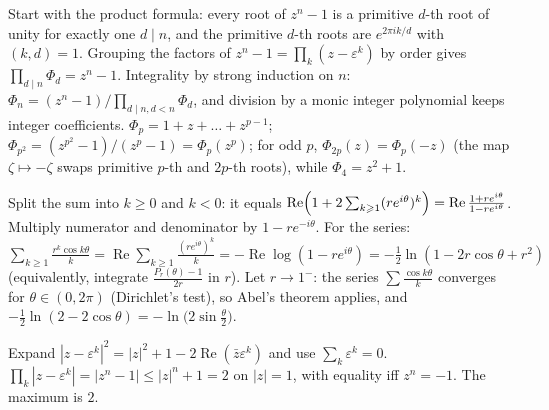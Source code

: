 \documentclass[11pt,a4paper]{article}
\begin{document}
 Start with the product formula: every root of $z^n-1$ is a primitive $d$-th root of unity for exactly one $d\mid n$, and the primitive $d$-th roots are $e^{2\pi ik/d}$ with $(k,d)=1$. Grouping the factors of $z^n-1=\prod_k(z-\varepsilon^k)$ by order gives $\prod_{d\mid n}\Phi_d=z^n-1$.
 Integrality by strong induction on $n$: $\Phi_n=(z^n-1)/\prod_{d\mid n,d<n}\Phi_d$, and division by a monic integer polynomial keeps integer coefficients.
 $\Phi_p=1+z+\dots+z^{p-1}$; $\Phi_{p^2}=(z^{p^2}-1)/(z^p-1)=\Phi_p(z^p)$; for odd $p$, $\Phi_{2p}(z)=\Phi_p(-z)$ (the map $\zeta\mapsto-\zeta$ swaps primitive $p$-th and $2p$-th roots), while $\Phi_4=z^2+1$.

 Split the sum into $k\ge0$ and $k<0$: it equals $\operatorname{Re}\Bigl(1+2\sum_{k\ge1}(re^{i\theta})^k\Bigr)=\operatorname{Re}\frac{1+re^{i\theta}}{1-re^{i\theta}}$. Multiply numerator and denominator by $1-re^{-i\theta}$.
 For the series: $\sum_{k\ge1}\frac{r^k\cos k\theta}{k}=\operatorname{Re}\sum_{k\ge1}\frac{(re^{i\theta})^k}k=-\operatorname{Re}\log(1-re^{i\theta})=-\tfrac12\ln(1-2r\cos\theta+r^2)$ (equivalently, integrate $\frac{P_r(\theta)-1}{2r}$ in $r$).
 Let $r\to1^-$: the series $\sum\frac{\cos k\theta}k$ converges for $\theta\in(0,2\pi)$ (Dirichlet's test), so Abel's theorem applies, and $-\frac12\ln(2-2\cos\theta)=-\ln\bigl(2\sin\frac\theta2\bigr)$.

 Expand $|z-\varepsilon^k|^2=|z|^2+1-2\operatorname{Re}(\bar z\varepsilon^k)$ and use $\sum_k\varepsilon^k=0$.
 $\prod_k|z-\varepsilon^k|=|z^n-1|\le|z|^n+1=2$ on $|z|=1$, with equality iff $z^n=-1$. The maximum is $2$.
\end{document}
